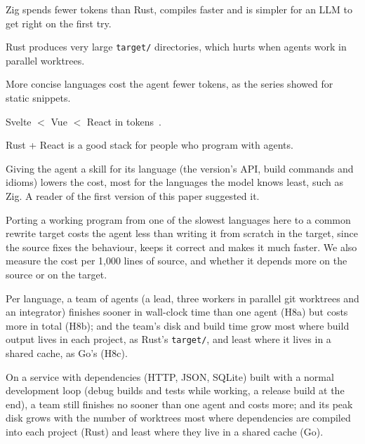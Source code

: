 \documentclass[11pt,a4paper]{article}
\begin{document}
\begin{description}[leftmargin=1.2em]
  \item[H1 (Zig)] Zig spends fewer tokens than Rust, compiles faster and is simpler for an LLM to get
        right on the first try.
  \item[H2 (Rust disk)] Rust produces very large \texttt{target/} directories, which hurts when agents
        work in parallel worktrees.
  \item[H3 (conciseness)] More concise languages cost the agent fewer tokens, as the series showed for
        static snippets.
  \item[H4 (front end)] Svelte $<$ Vue $<$ React in tokens~\cite{tokenomics1}.
  \item[H5 (Rust + React)] Rust + React is a good stack for people who program with agents.
  \item[H6 (skills)] Giving the agent a skill for its language (the version's API, build commands and
        idioms) lowers the cost, most for the languages the model knows least, such as Zig. A reader of
        the first version of this paper suggested it.
  \item[H7 (migration)] Porting a working program from one of the slowest languages here to a common
        rewrite target costs the agent less than writing it from scratch in the target, since the source
        fixes the behaviour, keeps it correct and makes it much faster. We also measure the cost per
        1,000 lines of source, and whether it depends more on the source or on the target.
  \item[H8 (swarm)] Per language, a team of agents (a lead, three workers in parallel git worktrees and an
        integrator) finishes sooner in wall-clock time than one agent (H8a) but costs more in total (H8b);
        and the team's disk and build time grow most where build output lives in each project, as Rust's
        \texttt{target/}, and least where it lives in a shared cache, as Go's (H8c).
  \item[H9 (swarm at work)] On a service with dependencies (HTTP, JSON, SQLite) built with a normal
        development loop (debug builds and tests while working, a release build at the end), a team still
        finishes no sooner than one agent and costs more; and its peak disk grows with the number of
        worktrees most where dependencies are compiled into each project (Rust) and least where they live in a
        shared cache (Go).
\end{description}
\end{document}
